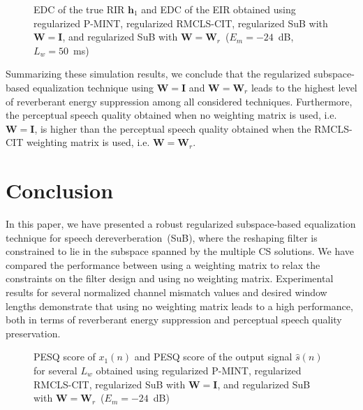 \documentclass{article}
\begin{document}
\begin{figure}[t!]
  
\caption{EDC of the true RIR $\mathbf{h}_1$ and EDC of the EIR obtained using regularized P-MINT, regularized RMCLS-CIT, regularized SuB with $\mathbf{W} = \mathbf{I}$, and regularized SuB with $\mathbf{W} = \mathbf{W}_{r}$~($E_m = -24$~dB, $L_w = 50$~ms)}
\label{fig: edc24}
\end{figure}

Summarizing these simulation results, we conclude that the regularized subspace-based equalization technique using $\mathbf{W} = \mathbf{I}$ and $\mathbf{W} = \mathbf{W}_{r}$ leads to the highest level of reverberant energy suppression among all considered techniques.
Furthermore, the perceptual speech quality obtained when no weighting matrix is used, i.e. $\mathbf{W} = \mathbf{I}$, is higher than the perceptual speech quality obtained when the RMCLS-CIT weighting matrix is used, i.e. $\mathbf{W} = \mathbf{W}_{r}$.

\vspace{-0.25cm}
\section {Conclusion}
\vspace{-0.25cm}

In this paper, we have presented a robust regularized subspace-based equalization technique for speech dereverberation~(SuB), where the reshaping filter is constrained to lie in the subspace spanned by the multiple CS solutions.
We have compared the performance between using a weighting matrix to relax the constraints on the filter design and using no weighting matrix.
Experimental results for several normalized channel mismatch values and desired window lengths demonstrate that using no weighting matrix leads to a high performance, both in terms of reverberant energy suppression and perceptual speech quality preservation.
\begin{figure}[t!]
  \vspace{0.25cm}
  
\caption{PESQ score of $x_1(n)$ and PESQ score of the output signal $\hat{s}(n)$ for several $L_w$ obtained using regularized P-MINT, regularized RMCLS-CIT, regularized SuB with $\mathbf{W} = \mathbf{I}$, and regularized SuB with $\mathbf{W} = \mathbf{W}_{r}$~($E_m = -24$~dB)}
\label{fig: pesq24}
\end{figure}





\end{document}
